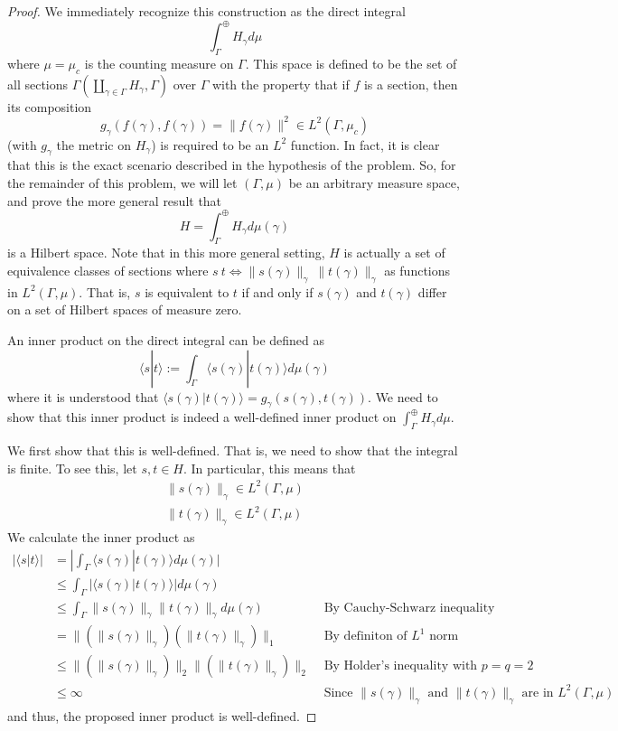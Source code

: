\documentclass[fontsize=11pt]{scrartcl} %
\numberwithin{equation}{section} %
\numberwithin{figure}{section} %
\numberwithin{table}{section} %
\newcommand{\la}{\langle}
\newcommand{\ra}{\rangle}
\begin{document}
\begin{proof}
    We immediately recognize this construction as the direct integral
    \[
        \int_{\Gamma}^{\oplus}H_{\gamma}d\mu
    \]
    where $\mu=\mu_c$ is the counting measure on $\Gamma$. This space is defined
    to be the set of all sections
    $\Gamma(\coprod_{\gamma\in\Gamma}H_{\gamma},\Gamma)$ over $\Gamma$ with the
    property that if $f$ is a section, then its composition
    \[
        g_{\gamma}(f(\gamma),f(\gamma)) = \|f(\gamma)\|^2\in L^2(\Gamma,\mu_c)
    \]
    (with $g_{\gamma}$ the metric on $H_{\gamma}$)
    is required to be an $L^2$ function. In fact, it is clear that this is the
    exact scenario described in the hypothesis of the problem.
    So, for the remainder of this problem, we will let $(\Gamma,\mu)$ be an
    arbitrary measure space, and prove the more general result that
    \[
        H = \int_{\Gamma}^{\oplus}H_{\gamma}d\mu(\gamma)
    \]
    is a Hilbert space. Note that in this more general setting, $H$ is actually
    a set of equivalence classes of sections where $s~t \iff
    \|s(\gamma)\|_{\gamma} ~ \|t(\gamma)\|_{\gamma}$ as functions in
    $L^2(\Gamma,\mu)$.
    That is, $s$ is equivalent to $t$ if and only if $s(\gamma)$ and
    $t(\gamma)$ differ on a set of Hilbert spaces of measure zero.

    An inner product on the direct integral can be defined as
    \[
        \la s|t\ra := \int_{\Gamma}\la s(\gamma)|t(\gamma)\ra d\mu(\gamma)
    \]
    where it is understood that $\la s(\gamma)|t(\gamma)\ra =
    g_{\gamma}(s(\gamma),t(\gamma))$.
    We need to show that this inner product is indeed a well-defined inner
    product on $\int_{\Gamma}^{\oplus}H_{\gamma}d\mu$.


    We first show that this is well-defined. That is, we need to show that the
    integral is finite. To see this, let $s,t\in H$. In particular, this means
    that
    \[
        \begin{aligned}
            \|s(\gamma)\|_{\gamma}\in L^2(\Gamma,\mu)\\
            \|t(\gamma)\|_{\gamma}\in L^2(\Gamma,\mu)
    \end{aligned}
    \]
    We calculate the inner product as
    \[
\begin{aligned}
    |\la s|t\ra| &= |\int_{\Gamma}\la s(\gamma)|t(\gamma)\ra d\mu(\gamma)|\\
    &\leq \int_{\Gamma}|\la s(\gamma)|t(\gamma)\ra| d\mu(\gamma)\\
    &\leq \int_{\Gamma}\|s(\gamma)\|_{\gamma}\|t(\gamma)\|_{\gamma}
    d\mu(\gamma)&\text{ By Cauchy-Schwarz inequality}\\
    &=\|\left(\|s(\gamma)\|_{\gamma}\right)\left(\|t(\gamma)\|_{\gamma}\right)\|_1
    &\text{ By definiton of $L^1$ norm}\\
    &\leq
    \|\left(\|s(\gamma)\|_{\gamma}\right)\|_2\|\left(\|t(\gamma)\|_{\gamma}\right)\|_2
    &\text{ By Holder's inequality with $p=q=2$}\\
    &\leq \infty &\text{ Since $\|s(\gamma)\|_{\gamma}$ and
    $\|t(\gamma)\|_{\gamma}$ are in $L^2(\Gamma,\mu)$}
\end{aligned}
    \]
    and thus, the proposed inner product is well-defined.


\end{proof}
\end{document}
